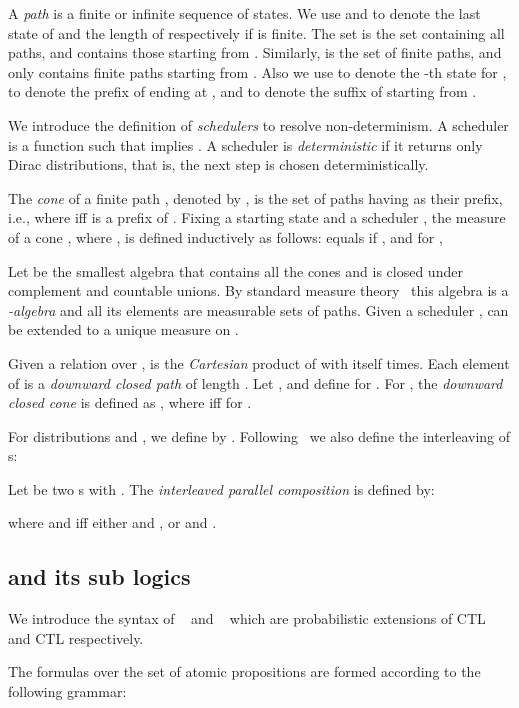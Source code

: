 \documentclass{LMCS}
\begin{document}
A \emph{path} is a finite or infinite sequence
 of states. 
We use  and  to denote the last
state of  and the length of  respectively if 
is finite. The set  is the set containing all paths, and
 contains those starting from . Similarly,
 is the set of finite paths, and
 only contains finite paths starting from . Also we use
 to denote the -th state for , 
to denote the prefix of  ending at , and
 to denote the suffix of  starting from
.

We introduce the definition of \emph{schedulers} to resolve non-determinism.
A scheduler is a
function  such that
 implies
. A scheduler  is
\emph{deterministic} if it returns only Dirac distributions, that
is, the next step is chosen deterministically.


The \emph{cone} of a finite path , denoted by ,
is the set of paths having  as their prefix, i.e.,
 where  iff  is a prefix of .
Fixing a starting state  and a scheduler , the measure
 of a cone , where
, is defined inductively as follows:  equals  if , and for ,


Let  be the smallest algebra that
contains all the cones and is closed under complement and countable
unions. By standard measure theory~\cite{halmos1974measure,rudin2006real} this algebra is a
\emph{-algebra} and all its elements are
measurable sets of paths. Given a scheduler ,
  can be extended to a unique
measure on .


Given a relation  over ,  is the \emph{Cartesian} product of
 with itself  times.
Each element of   is a \emph{downward closed path} of length .
Let , and define  for .
For , the
 \emph{downward closed cone}  is defined as
,
where  iff  for .


For distributions  and , we define  by .
Following~\cite{baier2008principles} we also define the interleaving of s:
\begin{defi}\label{def:interleave}
Let  be two s with . The \emph{interleaved parallel composition}  is defined by:

where  and  iff either  and , or  and .
\end{defi}

\subsection{\texorpdfstring{}{PCTL*} and its sub logics}
We introduce the syntax of ~\cite{hansson1994logic} and ~\cite{Aziz1995UWT} which are probabilistic extensions of {\sf CTL} and {\sf CTL} respectively.

The   formulas over the set  of atomic propositions are
formed according to the following grammar:
\end{document}
